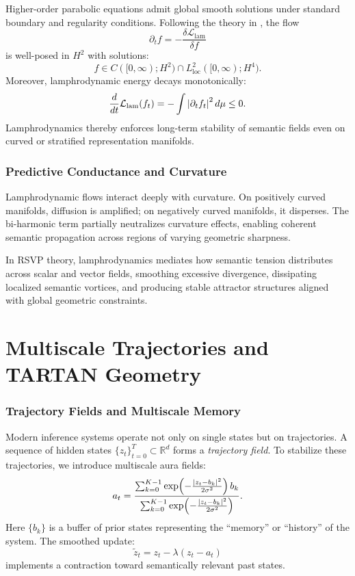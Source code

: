 \documentclass[12pt]{article}
\theoremstyle{plain}
\theoremstyle{definition}
\theoremstyle{remark}
\newcommand{\LamEnergy}{\mathcal{L}_{\mathrm{lam}}}
\begin{document}
Higher-order parabolic equations admit global smooth solutions under
standard boundary and regularity conditions. Following the theory in 
\citep{evans2010partial, davies1980oneparameter}, the flow
\[
\partial_t f = - \frac{\delta \LamEnergy}{\delta f}
\]
is well-posed in $H^2$ with solutions:
\[
f \in C([0,\infty); H^2) \cap L^2_{\mathrm{loc}}([0,\infty); H^4).
\]
Moreover, lamphrodynamic energy decays monotonically:
\[
\frac{d}{dt} \LamEnergy(f_t)
= - \int \abs{\partial_t f_t}^2\, d\mu \le 0.
\]
Lamphrodynamics thereby enforces long-term stability of semantic fields even 
on curved or stratified representation manifolds.

\section{Predictive Conductance and Curvature}

Lamphrodynamic flows interact deeply with curvature. On positively curved
manifolds, diffusion is amplified; on negatively curved manifolds, it disperses.
The bi-harmonic term partially neutralizes curvature effects, enabling coherent
semantic propagation across regions of varying geometric sharpness.

In RSVP theory, lamphrodynamics mediates how semantic tension distributes across
scalar and vector fields, smoothing excessive divergence, dissipating localized
semantic vortices, and producing stable attractor structures aligned with global
geometric constraints.

\newpage

\part{Multiscale Trajectories and TARTAN Geometry}

\section{Trajectory Fields and Multiscale Memory}

Modern inference systems operate not only on single states but on trajectories.
A sequence of hidden states $\{z_t\}_{t=0}^T \subset \mathbb{R}^d$ forms a 
\emph{trajectory field}. To stabilize these trajectories, we introduce 
multiscale aura fields:
\[
a_t 
= \frac{\sum_{k=0}^{K-1} \exp\!\left( -\frac{\abs{z_t - b_k}^2}{2\sigma^2} \right) b_k}
       {\sum_{k=0}^{K-1} \exp\!\left( -\frac{\abs{z_t - b_k}^2}{2\sigma^2} \right)}.
\]
Here $\{b_k\}$ is a buffer of prior states representing the ``memory'' or 
``history'' of the system. The smoothed update:
\[
\tilde{z}_t 
= z_t - \lambda (z_t - a_t)
\]
implements a contraction toward semantically relevant past states.
\end{document}
